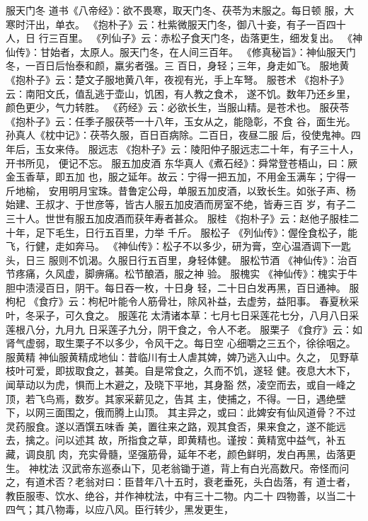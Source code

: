 \documentclass[12pt,UTF8]{ctexbook}
\begin{document}
服天门冬
道书《八帝经》：欲不畏寒，取天门冬、茯苓为末服之。每日顿
服，大寒时汗出，单衣。
《抱朴子》云：杜紫微服天门冬，御八十妾，有子一百四十人，日
行三百里。
《列仙子》云：赤松子食天门冬，齿落更生，细发复出。
《神仙传》：甘始者，太原人。服天门冬，在人间三百年。
《修真秘旨》：神仙服天门冬，一百日后怡泰和颜，羸劣者强。三
百日，身轻；三年，身走如飞。
服地黄
《抱朴子》云：楚文子服地黄八年，夜视有光，手上车弩。
服苍术
《抱朴子》云：南阳文氏，值乱逃于壶山，饥困，有人教之食术，
遂不饥。数年乃还乡里，颜色更少，气力转胜。
《药经》云：必欲长生，当服山精。是苍术也。
服茯苓
《抱朴子》云：任季子服茯苓一十八年，玉女从之，能隐彰，不食
谷，面生光。
孙真人《枕中记》：茯苓久服，百日百病除。二百日，夜昼二服
后，役使鬼神。四年后，玉女来侍。
服远志
《抱朴子》云：陵阳仲子服远志二十年，有子三十人，开书所见，
便记不忘。
服五加皮酒
东华真人《煮石经》：舜常登苍梧山，曰：厥金玉香草，即五加
也，服之延年。故云：宁得一把五加，不用金玉满车；宁得一斤地榆，
安用明月宝珠。昔鲁定公母，单服五加皮酒，以致长生。如张子声、杨
始建、王叔才、于世彦等，皆古人服五加皮酒而房室不绝，皆寿三百
岁，有子二三十人。世世有服五加皮酒而获年寿者甚众。
服桂
《抱朴子》云：赵他子服桂二十年，足下毛生，日行五百里，力举
千斤。
服松子
《列仙传》：偓佺食松子，能飞，行健，走如奔马。
《神仙传》：松子不以多少，研为膏，空心温酒调下一匙头，日三
服则不饥渴。久服日行五百里，身轻体健。
服松节酒
《神仙传》：治百节疼痛，久风虚，脚痹痛。松节酿酒，服之神
验。
服槐实
《神仙传》：槐实于牛胆中渍浸百日，阴干。每日吞一枚，十日身
轻，二十日白发再黑，百日通神。
服枸杞
《食疗》云：枸杞叶能令人筋骨壮，除风补益，去虚劳，益阳事。
春夏秋采叶，冬采子，可久食之。
服莲花
太清诸本草：七月七日采莲花七分，八月八日采莲根八分，九月九
日采莲子九分，阴干食之，令人不老。
服栗子
《食疗》云：如肾气虚弱，取生栗子不以多少，令风干之。每日空
心细嚼之三五个，徐徐咽之。
服黄精
神仙服黄精成地仙：昔临川有士人虐其婢，婢乃逃入山中。久之，
见野草枝叶可爱，即拔取食之，甚美。自是常食之，久而不饥，遂轻
健。夜息大木下，闻草动以为虎，惧而上木避之，及晓下平地，其身豁
然，凌空而去，或自一峰之顶，若飞鸟焉，数岁。其家采薪见之，告其
主，使捕之，不得。一日，遇绝壁下，以网三面围之，俄而腾上山顶。
其主异之，或曰：此婢安有仙风道骨？不过灵药服食。遂以酒馔五味香
美，置往来之路，观其食否，果来食之，遂不能远去，擒之。问以述其
故，所指食之草，即黄精也。谨按：黄精宽中益气，补五藏，调良肌
肉，充实骨髓，坚强筋骨，延年不老，颜色鲜明，发白再黑，齿落更
生。
神枕法
汉武帝东巡泰山下，见老翁锄于道，背上有白光高数尺。帝怪而问
之，有道术否？老翁对曰：臣昔年八十五时，衰老垂死，头白齿落，有
道士者，教臣服枣、饮水、绝谷，并作神枕法，中有三十二物。内二十
四物善，以当二十四气；其八物毒，以应八风。臣行转少，黑发更生，
\end{document}
